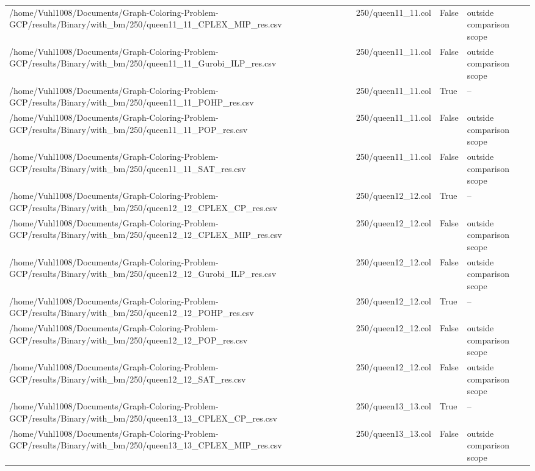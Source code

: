 \begin{table}[htbp]
\begin{tabular}{llll}
/home/Vuhl1008/Documents/Graph-Coloring-Problem-GCP/results/Binary/with\_bm/250/queen11\_11\_CPLEX\_MIP\_res.csv & 250/queen11\_11.col & False & outside comparison scope \\
/home/Vuhl1008/Documents/Graph-Coloring-Problem-GCP/results/Binary/with\_bm/250/queen11\_11\_Gurobi\_ILP\_res.csv & 250/queen11\_11.col & False & outside comparison scope \\
/home/Vuhl1008/Documents/Graph-Coloring-Problem-GCP/results/Binary/with\_bm/250/queen11\_11\_POHP\_res.csv & 250/queen11\_11.col & True & -- \\
/home/Vuhl1008/Documents/Graph-Coloring-Problem-GCP/results/Binary/with\_bm/250/queen11\_11\_POP\_res.csv & 250/queen11\_11.col & False & outside comparison scope \\
/home/Vuhl1008/Documents/Graph-Coloring-Problem-GCP/results/Binary/with\_bm/250/queen11\_11\_SAT\_res.csv & 250/queen11\_11.col & False & outside comparison scope \\
/home/Vuhl1008/Documents/Graph-Coloring-Problem-GCP/results/Binary/with\_bm/250/queen12\_12\_CPLEX\_CP\_res.csv & 250/queen12\_12.col & True & -- \\
/home/Vuhl1008/Documents/Graph-Coloring-Problem-GCP/results/Binary/with\_bm/250/queen12\_12\_CPLEX\_MIP\_res.csv & 250/queen12\_12.col & False & outside comparison scope \\
/home/Vuhl1008/Documents/Graph-Coloring-Problem-GCP/results/Binary/with\_bm/250/queen12\_12\_Gurobi\_ILP\_res.csv & 250/queen12\_12.col & False & outside comparison scope \\
/home/Vuhl1008/Documents/Graph-Coloring-Problem-GCP/results/Binary/with\_bm/250/queen12\_12\_POHP\_res.csv & 250/queen12\_12.col & True & -- \\
/home/Vuhl1008/Documents/Graph-Coloring-Problem-GCP/results/Binary/with\_bm/250/queen12\_12\_POP\_res.csv & 250/queen12\_12.col & False & outside comparison scope \\
/home/Vuhl1008/Documents/Graph-Coloring-Problem-GCP/results/Binary/with\_bm/250/queen12\_12\_SAT\_res.csv & 250/queen12\_12.col & False & outside comparison scope \\
/home/Vuhl1008/Documents/Graph-Coloring-Problem-GCP/results/Binary/with\_bm/250/queen13\_13\_CPLEX\_CP\_res.csv & 250/queen13\_13.col & True & -- \\
/home/Vuhl1008/Documents/Graph-Coloring-Problem-GCP/results/Binary/with\_bm/250/queen13\_13\_CPLEX\_MIP\_res.csv & 250/queen13\_13.col & False & outside comparison scope \\

\end{tabular}
\end{table}
